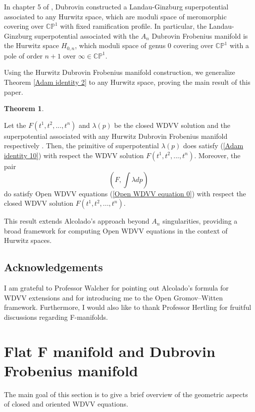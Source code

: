 \documentclass{article}
\theoremstyle{definition}
\newtheorem{theorem}{Theorem}[section]
\begin{document}
In chapter 5 of  \cite{B. Dubrovin2}, Dubrovin constructed a Landau-Ginzburg superpotential associated to any Hurwitz space, which are moduli space of meromorphic covering over $\mathbb{CP}^1$ with fixed ramification profile. In particular, the  Landau-Ginzburg superpotential associated with the $A_n$ Dubrovin Frobenius manifold is the Hurwitz space $H_{0,n}$, which moduli space of genus 0 covering over  $\mathbb{CP}^1$ with a pole of order $n+1$ over $\infty \in \mathbb{CP}^1$. 

Using the Hurwitz Dubrovin Frobenius manifold construction, we generalize Theorem \ref{Adam identity 2} to any Hurwitz space, proving the main result of this paper.


\begin{theorem}\label{Main theorem Almeida}

Let the  $F(t^1, t^2, ..., t^n)$ and $\lambda(p)$
be the closed WDVV solution and the superpotential associated  with any Hurwitz Dubrovin Frobenius manifold respectively . Then, the primitive of superpotential $\lambda(p)$ does satisfy (\ref{Adam identity 10}) with respect the WDVV solution $F(t^1, t^2, ..., t^n)$. Moreover, the pair
\begin{equation*}
\left(F, \int \lambda dp\right)
\end{equation*}
do satisfy  Open WDVV equations (\ref{Open WDVV equation 0}) with respect the closed  WDVV solution $F(t^1, t^2, ..., t^n)$.
\end{theorem}

This result extends Alcolado’s approach beyond $A_n$ singularities, providing a broad framework for computing Open WDVV equations in the context of Hurwitz spaces.

\subsection*{Acknowledgements}
I am grateful to Professor Walcher for pointing out Alcolado's formula for WDVV extensions and for introducing me to the Open Gromov–Witten framework. Furthermore, I would also like to thank Professor Hertling for fruitful discussions regarding F-manifolds.

\section{Flat F manifold and Dubrovin Frobenius manifold}\label{Flat F manifold and Dubrovin Frobenius manifold}

The main goal of this section is to give a brief overview of the geometric aspects of closed and oriented WDVV equations.\\
\end{document}
